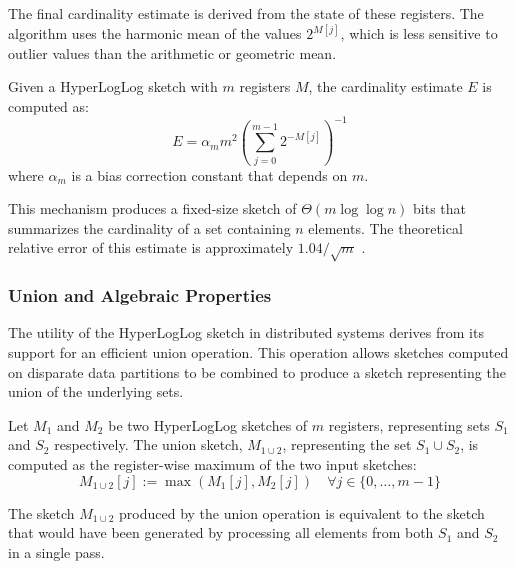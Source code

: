 The final cardinality estimate is derived from the state of these registers. The algorithm uses the harmonic mean of the values $2^{M[j]}$, which is less sensitive to outlier values than the arithmetic or geometric mean.

\begin{proposition}
    Given a HyperLogLog sketch with $m$ registers $M$, the cardinality estimate $E$ is computed as:
    \begin{equation*}
        E = \alpha_m m^2 \left( \sum_{j=0}^{m-1} 2^{-M[j]} \right)^{-1}
    \end{equation*}
    where $\alpha_m$ is a bias correction constant that depends on $m$.
\end{proposition}

This mechanism produces a fixed-size sketch of $\Theta(m \log\log n)$ bits that summarizes the cardinality of a set containing $n$ elements. The theoretical relative error of this estimate is approximately $1.04/\sqrt{m}$ \cite{Flajolet2007HyperLogLogTA}.

\subsubsection{Union and Algebraic Properties} \label{subsubsec:hll-union}

The utility of the HyperLogLog sketch in distributed systems derives from its support for an efficient union operation. This operation allows sketches computed on disparate data partitions to be combined to produce a sketch representing the union of the underlying sets.

\begin{definition}
    Let $M_1$ and $M_2$ be two HyperLogLog sketches of $m$ registers, representing sets $S_1$ and $S_2$ respectively. The union sketch, $M_{1 \cup 2}$, representing the set $S_1 \cup S_2$, is computed as the register-wise maximum of the two input sketches:
    \begin{equation*}
        M_{1 \cup 2}[j] := \max(M_1[j], M_2[j]) \quad \forall j \in \{0, \ldots, m-1\}
    \end{equation*}
\end{definition}

\begin{theorem}
    The sketch $M_{1 \cup 2}$ produced by the union operation is equivalent to the sketch that would have been generated by processing all elements from both $S_1$ and $S_2$ in a single pass.
\end{theorem}

